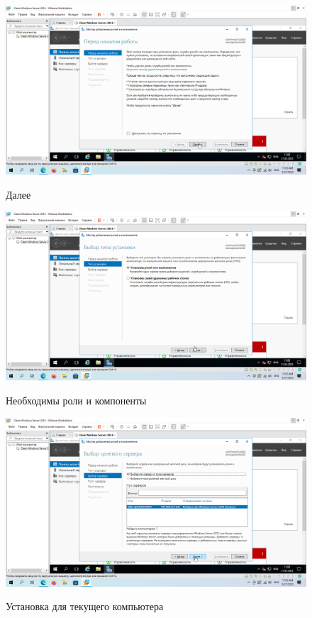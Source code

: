 \documentclass[a4paper]{article}
\begin{document}
  \begin{figure}[H]
    \centering
    \includegraphics[width=\textwidth]{11_0003}
    \label{img:3}
    \caption{Далее}
  \end{figure}

  \begin{figure}[H]
    \centering
    \includegraphics[width=\textwidth]{11_0004}
    \label{img:4}
    \caption{Необходимы роли и компоненты}
  \end{figure}

  \begin{figure}[H]
    \centering
    \includegraphics[width=\textwidth]{11_0005}
    \label{img:5}
    \caption{Установка для текущего компьютера}
  \end{figure}
\end{document}

